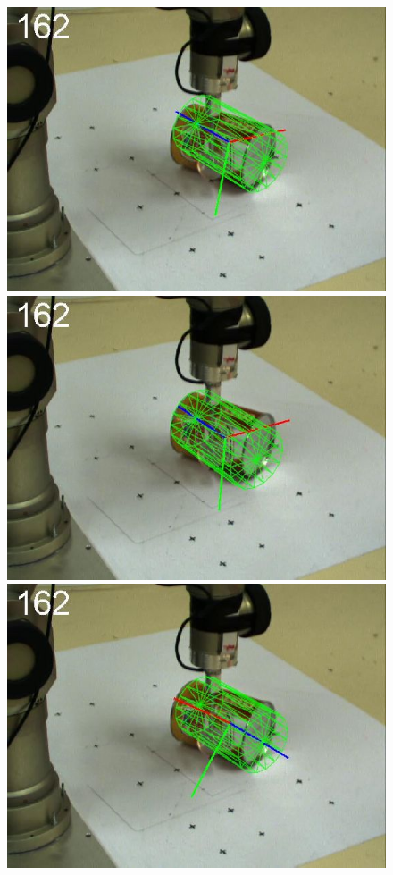 \begin{figure}[htbp]
{\includegraphics[width=\imgAXwid]{./A3_2exp_39_3}
\includegraphics[width=\imgAXwid]{./A3_LWPR1_39_3}
\includegraphics[width=\imgAXwid]{./A3_physx_39_3}
}
\end{figure}
